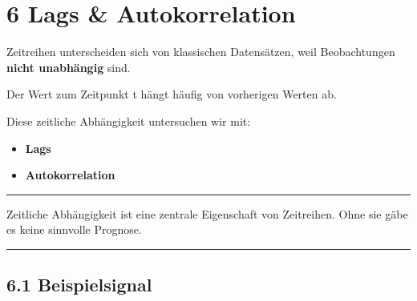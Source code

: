 \documentclass[
  ngerman,
  letterpaper,
  DIV=11]{scrreprt}
\providecommand{\tightlist}{%
  \setlength{\itemsep}{0pt}\setlength{\parskip}{0pt}}
\begin{document}

\chapter{6 Lags \& Autokorrelation}\label{lags-autokorrelation-1}

Zeitreihen unterscheiden sich von klassischen Datensätzen, weil
Beobachtungen \textbf{nicht unabhängig} sind.

Der Wert zum Zeitpunkt t hängt häufig von vorherigen Werten ab.

Diese zeitliche Abhängigkeit untersuchen wir mit:

\begin{itemize}
\tightlist
\item
  \textbf{Lags}
\item
  \textbf{Autokorrelation}
\end{itemize}

\begin{center}\rule{0.5\linewidth}{0.5pt}\end{center}

\begin{tcolorbox}[enhanced jigsaw, titlerule=0mm, title=\textcolor{quarto-callout-note-color}{\faInfo}\hspace{0.5em}{Merke}, bottomrule=.15mm, opacityback=0, colbacktitle=quarto-callout-note-color!10!white, coltitle=black, opacitybacktitle=0.6, colframe=quarto-callout-note-color-frame, toprule=.15mm, leftrule=.75mm, arc=.35mm, rightrule=.15mm, breakable, bottomtitle=1mm, colback=white, toptitle=1mm, left=2mm]

Zeitliche Abhängigkeit ist eine zentrale Eigenschaft von Zeitreihen.
Ohne sie gäbe es keine sinnvolle Prognose.

\end{tcolorbox}

\begin{center}\rule{0.5\linewidth}{0.5pt}\end{center}

\section{6.1 Beispielsignal}\label{beispielsignal-2}
\end{document}
